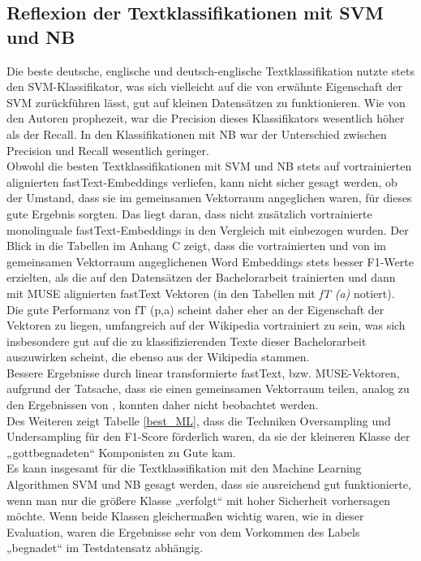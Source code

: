 \documentclass[ngerman]{ttlab-qualify}
\begin{document}
\subsection{Reflexion der Textklassifikationen mit SVM und NB}
Die beste deutsche, englische und deutsch-englische Textklassifikation nutzte stets den SVM-Klassifikator, was sich vielleicht auf die von \textcite{manning2008introduction} erwähnte Eigenschaft der SVM zurückführen lässt, gut auf kleinen Datensätzen zu funktionieren. Wie von den Autoren prophezeit, war die Precision dieses Klassifikators wesentlich höher als der Recall. In den Klassifikationen mit NB war der Unterschied zwischen Precision und Recall wesentlich geringer.\\
Obwohl die besten Textklassifikationen mit SVM und NB stets auf vortrainierten alignierten fastText-Embeddings verliefen, kann nicht sicher gesagt werden, ob der Umstand, dass sie im gemeinsamen Vektorraum angeglichen waren, für dieses gute Ergebnis sorgten. Das liegt daran, dass nicht zusätzlich vortrainierte monolinguale fastText-Embeddings in den Vergleich mit einbezogen wurden. Der Blick in die Tabellen im Anhang C zeigt, dass die vortrainierten und von \textcite{conneau2017word} im gemeinsamen Vektorraum angeglichenen Word Embeddings stets besser F1-Werte erzielten, als die auf den Datensätzen der Bachelorarbeit trainierten und dann mit MUSE alignierten fastText Vektoren (in den Tabellen mit \textit{fT (a)} notiert).\\
Die gute Performanz von fT (p,a) scheint daher eher an der Eigenschaft der Vektoren zu liegen, umfangreich auf der Wikipedia vortrainiert zu sein, was sich insbesondere gut auf die zu klassifizierenden Texte dieser Bachelorarbeit auszuwirken scheint, die ebenso aus der Wikipedia stammen.\\
Bessere Ergebnisse durch linear transformierte fastText, bzw. MUSE-Vektoren, aufgrund der Tatsache, dass sie einen gemeinsamen Vektorraum teilen, analog zu den Ergebnissen von \textcite{jiang2019cross}, konnten daher nicht beobachtet werden.
\\
Des Weiteren zeigt Tabelle \ref{best_ML}, dass die Techniken Oversampling und Undersampling für den F1-Score förderlich waren, da sie der kleineren Klasse der „gottbegnadeten“ Komponisten zu Gute kam.\\ 
Es kann insgesamt für die Textklassifikation mit den Machine Learning Algorithmen SVM und NB gesagt werden, dass sie ausreichend gut funktionierte, wenn man nur die größere Klasse „verfolgt“ mit hoher Sicherheit vorhersagen möchte. Wenn beide Klassen gleichermaßen wichtig waren, wie in dieser Evaluation, waren die Ergebnisse sehr von dem Vorkommen des Labels „begnadet“ im Testdatensatz abhängig.\\
\end{document}
